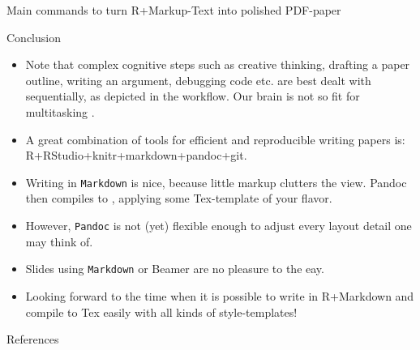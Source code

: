 \documentclass[final,hyperref={pdfpagelabels=false}]{beamer}
\begin{document}
\begin{frame}{}
\begin{columns}[t]
\begin{column}{.48\linewidth}
\begin{block}{Main commands to turn R+Markup-Text into polished PDF-paper}
        \end{block}
        
        
        
        \begin{block}{Conclusion}
            \begin{itemize}
            \item Note that complex cognitive steps such as creative thinking, drafting a paper outline, writing an argument, debugging code etc. are best dealt with sequentially, as depicted in the workflow. Our brain is not so fit for multitasking \cite{Clapp2011}.
             \item A great combination of tools for efficient and reproducible writing papers is: R+RStudio+knitr+markdown+pandoc+git.    
             \item Writing in \texttt{Markdown} is nice, because little markup clutters the view. Pandoc then compiles to \Latex, applying some Tex-template of your flavor.
             \item However,  \texttt{Pandoc} is not (yet) flexible enough to adjust every layout detail one may think of. 
             \item Slides using \texttt{Markdown} or {\Latex Beamer} are no pleasure to the eay.
             \item Looking forward to the time when it is possible to write in R+Markdown and compile to Tex easily with all kinds of style-templates!
                \end{itemize}
        \end{block}     



     \begin{block}{References}
     \begin{tiny}
   
     
     
     \end{tiny}
     \end{block}     
   
   
         \end{column}
    \end{columns}
  \end{frame}
\end{document}

